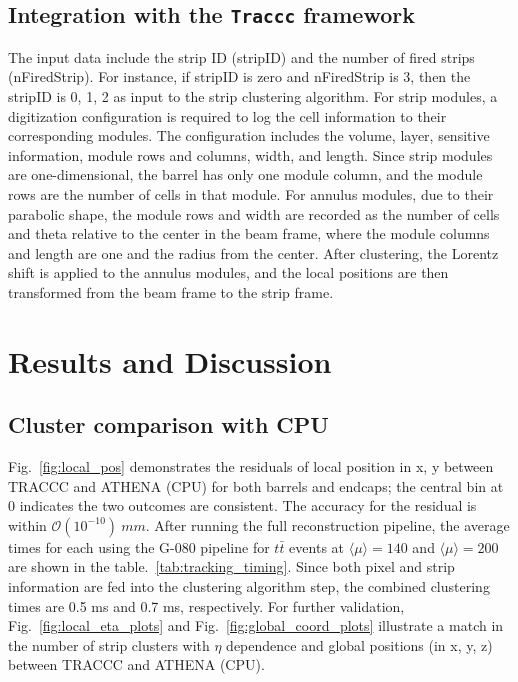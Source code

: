 \FloatBarrier
\subsection{Integration with the \texttt{Traccc} framework}
The input data include the strip ID (stripID) and the number of fired strips (nFiredStrip). For instance, if stripID is zero and nFiredStrip is 3, then the stripID is 0, 1, 2 as input to the strip clustering algorithm. For strip modules, a digitization configuration is required to log the cell information to their corresponding modules. The configuration includes the volume, layer, sensitive information, module rows and columns, width, and length. Since strip modules are one-dimensional, the barrel has only one module column, and the module rows are the number of cells in that module. For annulus modules, due to their parabolic shape, the module rows and width are recorded as the number of cells and theta relative to the center in the beam frame, where the module columns and length are one and the radius from the center. After clustering, the Lorentz shift is applied to the annulus modules, and the local positions are then transformed from the beam frame to the strip frame. 

\FloatBarrier
\section{Results and Discussion}
\subsection{Cluster comparison with CPU}

Fig.~\ref{fig:local_pos} demonstrates the residuals of local position in x, y between TRACCC and ATHENA (CPU) for both barrels and endcaps; the central bin at 0 indicates the two outcomes are consistent. The accuracy for the residual is within $\mathcal{O}(10^{-10})~mm$. After running the full reconstruction pipeline, the average times for each using the G-080 pipeline for $t\bar{t}$ events at $\langle\mu\rangle=140$ and $\langle\mu\rangle=200$ are shown in the table.~\ref{tab:tracking_timing}. Since both pixel and strip information are fed into the clustering algorithm step, the combined clustering times are 0.5 ms and 0.7 ms, respectively. For further validation, Fig.~\ref{fig:local_eta_plots} and Fig.~\ref{fig:global_coord_plots} illustrate a match in the number of strip clusters with $\eta$ dependence and global positions (in x, y, z) between TRACCC and ATHENA (CPU).

